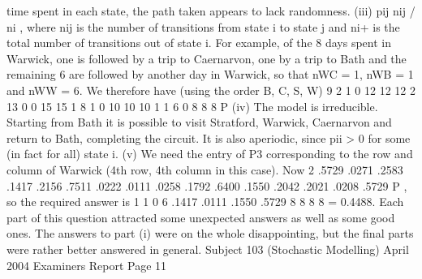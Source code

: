 time spent in each state, the path taken appears to lack randomness.
(iii) pij nij / ni , where nij is the number of transitions from state i to state j and
ni+ is the total number of transitions out of state i. For example, of the 8 days
spent in Warwick, one is followed by a trip to Caernarvon, one by a trip to
Bath and the remaining 6 are followed by another day in Warwick, so that nWC
= 1, nWB = 1 and nWW = 6. We therefore have (using the order B, C, S, W)
9 2 1
0
12 12 12
2 13
0 0
15 15
1 8 1
0
10 10 10
1 1 6
0
8 8 8
P
(iv) The model is irreducible. Starting from Bath it is possible to visit Stratford,
Warwick, Caernarvon and return to Bath, completing the circuit.
It is also aperiodic, since pii > 0 for some (in fact for all) state i.
(v) We need the entry of P3 corresponding to the row and column of Warwick
(4th row, 4th column in this case).
Now 2
.5729 .0271 .2583 .1417
.2156 .7511 .0222 .0111
.0258 .1792 .6400 .1550
.2042 .2021 .0208 .5729
P , so the required answer is
1 1 0 6
.1417 .0111 .1550 .5729
8 8 8 8
= 0.4488.
Each part of this question attracted some unexpected answers as well as some good
ones. The answers to part (i) were on the whole disappointing, but the final parts were
rather better answered in general.
Subject 103 (Stochastic Modelling) April 2004 Examiners Report
Page 11
